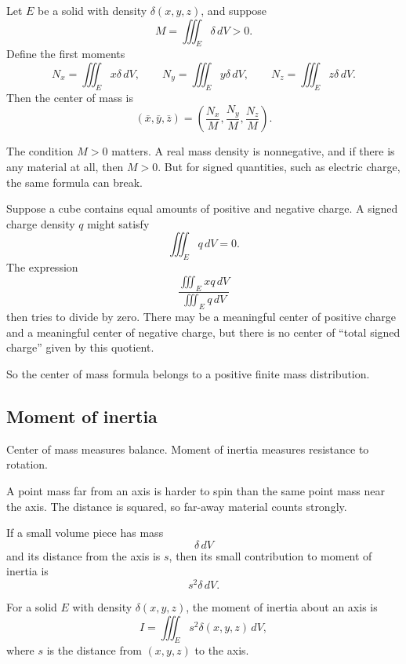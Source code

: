 \begin{definition}
Let \(E\) be a solid with density \(\delta(x,y,z)\), and suppose
\[
    M=\iiint_E \delta\,dV>0.
\]
Define the first moments
\[
    N_x=\iiint_E x\delta\,dV,
    \qquad
    N_y=\iiint_E y\delta\,dV,
    \qquad
    N_z=\iiint_E z\delta\,dV.
\]
Then the center of mass is
\[
\boxed{
    (\bar x,\bar y,\bar z)
    =
    \left(
        \frac{N_x}{M},
        \frac{N_y}{M},
        \frac{N_z}{M}
    \right).
}
\]
\end{definition}

The condition \(M>0\) matters.  A real mass density is nonnegative, and if there is any
material at all, then \(M>0\).  But for signed quantities, such as electric charge, the
same formula can break.

\begin{example}
Suppose a cube contains equal amounts of positive and negative charge.  A signed
charge density \(q\) might satisfy
\[
    \iiint_E q\,dV=0.
\]
The expression
\[
    \frac{\iiint_E xq\,dV}{\iiint_E q\,dV}
\]
then tries to divide by zero.  There may be a meaningful center of positive charge and a
meaningful center of negative charge, but there is no center of ``total signed charge''
given by this quotient.

So the center of mass formula belongs to a positive finite mass distribution.
\end{example}

\subsection{Moment of inertia}

Center of mass measures balance.  Moment of inertia measures resistance to rotation.

A point mass far from an axis is harder to spin than the same point mass near the axis.
The distance is squared, so far-away material counts strongly.

If a small volume piece has mass
\[
    \delta\,dV
\]
and its distance from the axis is \(s\), then its small contribution to moment of inertia
is
\[
    s^2\delta\,dV.
\]

\begin{definition}
For a solid \(E\) with density \(\delta(x,y,z)\), the moment of inertia about an axis
is
\[
\boxed{
    I=\iiint_E s^2\delta(x,y,z)\,dV,
}
\]
where \(s\) is the distance from \((x,y,z)\) to the axis.
\end{definition}

